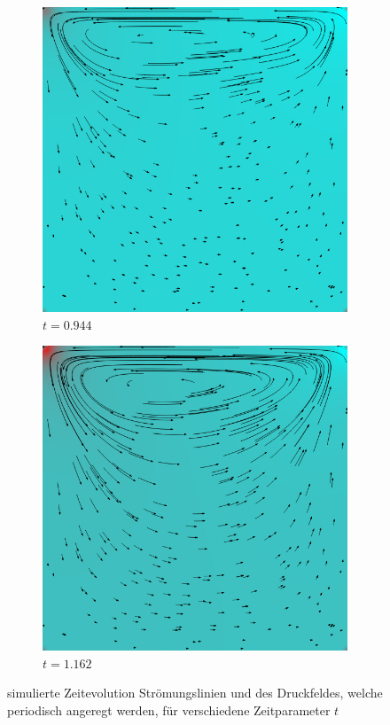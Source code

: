 \begin{figure}[!htb]
			\begin{subfigure}[b]{.5\textwidth}
				\includegraphics[scale = 0.28]{screenshots/periodic-00944.png}
				\caption{$t=0.944$}
			\end{subfigure}%
			\begin{subfigure}[b]{.5\textwidth}
				\includegraphics[scale = 0.28]{screenshots/periodic-01162.png}
				\caption{$t=1.162$}
			\end{subfigure}
			\caption{simulierte Zeitevolution Strömungslinien und des Druckfeldes, welche periodisch angeregt werden, für verschiedene Zeitparameter $t$}
			\label{fig:periodic 1}
		\end{figure}

